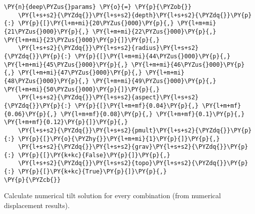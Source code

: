 \begin{tcolorbox}[breakable, size=fbox, boxrule=1pt, pad at break*=1mm,colback=cellbackground, colframe=cellborder]
\begin{Verbatim}[commandchars=\\\{\}]
\PY{n}{deep\PYZus{}params} \PY{o}{=} \PY{p}{\PYZob{}}
    \PY{l+s+s2}{\PYZdq{}}\PY{l+s+s2}{depth}\PY{l+s+s2}{\PYZdq{}}\PY{p}{:} \PY{p}{[}\PY{l+m+mi}{20\PYZus{}000}\PY{p}{,} \PY{l+m+mi}{21\PYZus{}000}\PY{p}{,} \PY{l+m+mi}{22\PYZus{}000}\PY{p}{,} \PY{l+m+mi}{23\PYZus{}000}\PY{p}{]}\PY{p}{,}
    \PY{l+s+s2}{\PYZdq{}}\PY{l+s+s2}{radius}\PY{l+s+s2}{\PYZdq{}}\PY{p}{:} \PY{p}{[}\PY{l+m+mi}{44\PYZus{}000}\PY{p}{,} \PY{l+m+mi}{45\PYZus{}000}\PY{p}{,} \PY{l+m+mi}{46\PYZus{}000}\PY{p}{,} \PY{l+m+mi}{47\PYZus{}000}\PY{p}{,} \PY{l+m+mi}{48\PYZus{}000}\PY{p}{,} \PY{l+m+mi}{49\PYZus{}000}\PY{p}{,} \PY{l+m+mi}{50\PYZus{}000}\PY{p}{]}\PY{p}{,}
    \PY{l+s+s2}{\PYZdq{}}\PY{l+s+s2}{aspect}\PY{l+s+s2}{\PYZdq{}}\PY{p}{:} \PY{p}{[}\PY{l+m+mf}{0.04}\PY{p}{,} \PY{l+m+mf}{0.06}\PY{p}{,} \PY{l+m+mf}{0.08}\PY{p}{,} \PY{l+m+mf}{0.1}\PY{p}{,} \PY{l+m+mf}{0.12}\PY{p}{]}\PY{p}{,}
    \PY{l+s+s2}{\PYZdq{}}\PY{l+s+s2}{pmult}\PY{l+s+s2}{\PYZdq{}}\PY{p}{:} \PY{p}{[}\PY{o}{\PYZhy{}}\PY{l+m+mi}{1}\PY{p}{]}\PY{p}{,}
    \PY{l+s+s2}{\PYZdq{}}\PY{l+s+s2}{grav}\PY{l+s+s2}{\PYZdq{}}\PY{p}{:} \PY{p}{[}\PY{k+kc}{False}\PY{p}{]}\PY{p}{,}
    \PY{l+s+s2}{\PYZdq{}}\PY{l+s+s2}{topo}\PY{l+s+s2}{\PYZdq{}}\PY{p}{:} \PY{p}{[}\PY{k+kc}{True}\PY{p}{]}\PY{p}{,}
\PY{p}{\PYZcb{}}
\end{Verbatim}
\end{tcolorbox}

    Calculate numerical tilt solution for every combination (from numerical
displacement results).

